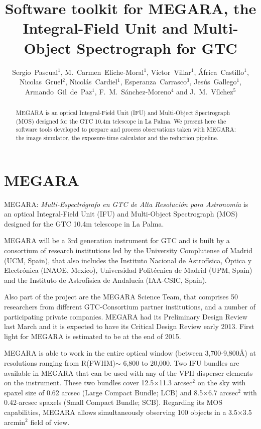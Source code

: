 \documentclass[11pt,twoside]{article}
\begin{document}
\title{Software toolkit for MEGARA, the Integral-Field Unit and Multi-Object Spectrograph
for GTC}
\author{Sergio~Pascual$^1$, M.~Carmen~Eliche-Moral$^1$, 
V\'ictor~Villar$^1$, \'Africa~Castillo$^1$, Nicolas~Gruel$^2$, 
Nicol\'as~Cardiel$^1$, Esperanza~Carrasco$^3$, Jes\'us~Gallego$^1$, 
Armando~Gil~de~Paz$^1$, F.~M.~S\'anchez-Moreno$^4$
and J.~M.~V\'ilchez$^5$
}

\begin{abstract}
MEGARA is an optical Integral-Field Unit (IFU) and Multi-Object Spectrograph (MOS) designed for the GTC 10.4m telescope in La Palma. 
We present here the software tools developed to prepare and process observations taken with MEGARA: the image simulator, the exposure-time calculator and the reduction pipeline.
\end{abstract}

\section{MEGARA}
MEGARA: \emph{Multi-Espectr\'ografo en GTC de Alta Resoluci\'on para Astronom\'ia}
 is an optical Integral-Field Unit (IFU) and Multi-Object Spectrograph (MOS) designed for the GTC 10.4m telescope in La Palma.

MEGARA will be a 3rd generation instrument for GTC and is built by a consortium of research institutions led by the University Complutense of Madrid (UCM, Spain), that also includes the Instituto Nacional de Astrof\'isica, \'Optica y Electr\'onica (INAOE, Mexico), Universidad Polit\'ecnica de Madrid (UPM, Spain) and the Instituto de Astrof\'isica de Andaluc\'ia  (IAA-CSIC, Spain).

Also part of the project are the MEGARA Science Team, that comprises 50 researchers from different GTC-Consortium partner institutions, and a number of participating private companies.  MEGARA had its Preliminary Design Review last March and it is expected to have its Critical Design Review early 2013. First light for MEGARA is estimated to be at the end of 2015.

MEGARA is able to work in the entire optical window (between 3,700-9,800\AA) at resolutions ranging from R(FWHM)$\sim$ 6,800 to 20,000. Two
IFU bundles are available in MEGARA that can be used with any of the VPH disperser elements on the instrument. These two bundles cover 12.5$\times$11.3 arcsec$^2$ on the sky with spaxel size of 0.62 arcsec (Large Compact
Bundle; LCB) and 8.5$\times$6.7 arcsec$^2$ with 0.42-arcsec spaxels (Small Compact Bundle; SCB). Regarding its MOS
capabilities, MEGARA allows simultaneously observing 100 objects in a 3.5$\times$3.5 arcmin$^2$ field of view. 
\end{document}
